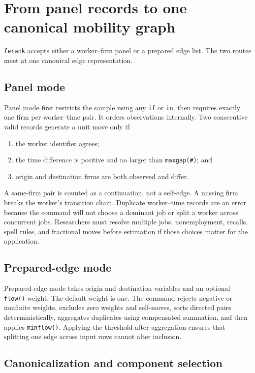 \documentclass[11pt]{article}
\begin{document}
\section{From panel records to one canonical mobility graph}
\label{sec:construction}

\texttt{ferank} accepts either a worker--firm panel or a prepared edge list.
The two routes meet at one canonical edge representation.

\subsection{Panel mode}

Panel mode first restricts the sample using any \texttt{if} or \texttt{in},
then requires exactly one firm per worker--time pair. It orders observations
internally. Two consecutive valid records generate a unit move only if:
\begin{enumerate}
  \item the worker identifier agrees;
  \item the time difference is positive and no larger than
  \texttt{maxgap(\#)}; and
  \item origin and destination firms are both observed and differ.
\end{enumerate}
A same-firm pair is counted as a continuation, not a self-edge. A missing firm
breaks the worker's transition chain. Duplicate worker--time records are an
error because the command will not choose a dominant job or split a worker
across concurrent jobs. Researchers must resolve multiple jobs, nonemployment,
recalls, spell rules, and fractional moves before estimation if those choices
matter for the application.

\subsection{Prepared-edge mode}

Prepared-edge mode takes origin and destination variables and an optional
\texttt{flow()} weight. The default weight is one. The command rejects negative
or nonfinite weights, excludes zero weights and self-moves, sorts directed
pairs deterministically, aggregates duplicates using compensated summation,
and then applies \texttt{minflow()}. Applying the threshold after aggregation
ensures that splitting one edge across input rows cannot alter inclusion.

\subsection{Canonicalization and component selection}
\end{document}
